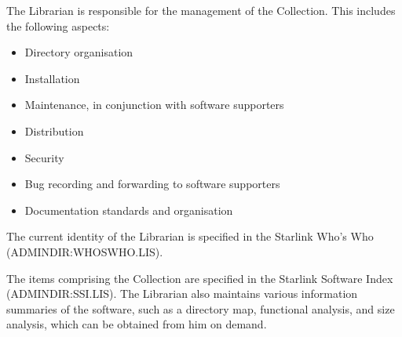 The Librarian is responsible for the management of the Collection.
This includes the following aspects:
\begin{itemize}
\item Directory organisation
\item Installation
\item Maintenance, in conjunction with software supporters
\item Distribution
\item Security
\item Bug recording and forwarding to software supporters
\item Documentation standards and organisation
\end{itemize}
The current identity of the Librarian is specified in the Starlink Who's Who
(ADMIN\-DIR:\-WHOS\-WHO.\-LIS).

The items comprising the Collection are specified in the Starlink Software
Index (ADMINDIR:SSI.LIS).
The Librarian also maintains various information summaries of the software,
such as a directory map, functional analysis, and size analysis, which can be
obtained from him on demand.

